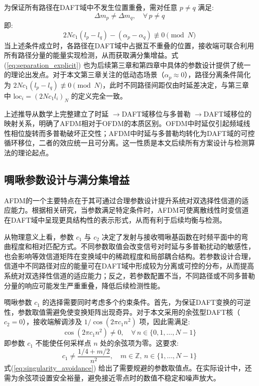 为保证所有路径在DAFT域中不发生位置重叠，需对任意 $p \neq q$ 满足:
\begin{equation}
    \Delta m_p \neq \Delta m_q, \quad \forall\, p \neq q
    \label{eq:path_separation_condition}
\end{equation}
即:
\begin{equation}
    2Nc_1(l_p - l_q) - (\alpha_p - \alpha_q) \not\equiv 0 \pmod{N}
    \label{eq:separation_explicit}
\end{equation}
当上述条件成立时，各路径在DAFT域中占据互不重叠的位置，接收端可联合利用所有路径分量的能量实现检测，从而获取满分集增益。式(\ref{eq:separation_explicit}) 也为后续第三章和第四章中具体的参数设计提供了统一的理论出发点。对于本文第三章关注的低动态场景（$\alpha_p \approx 0$），路径分离条件简化为 $2Nc_1(l_p - l_q) \not\equiv 0 \pmod{N}$，此时不同路径间距仅由时延差决定，与第三章中 $\mathrm{loc}_i = (2Nc_1 l_i)_N$ 的定义完全一致。

上述推导从数学上完整建立了时延 $\to$DAFT域移位与多普勒 $\to$DAFT域移位的映射关系，明确了AFDM相对于OFDM的本质区别。OFDM中时延仅引起频域线性相位旋转而多普勒破坏正交性；AFDM中时延与多普勒均转化为DAFT域的可控循环移位，二者的效应统一且可分离。这一性质是本文后续所有方案设计与检测算法的理论起点。

\subsection{啁啾参数设计与满分集增益}

AFDM的一个主要特点在于其可通过合理参数设计提升系统对双选择性信道的适应能力。根据相关研究，当参数满足特定条件时，AFDM可使离散线性时变信道在DAFT域中呈现更具结构性的表示形式，从而有利于后续均衡与检测\cite{bemaniAFDMFullDiversity2021, taoAffineFrequencyDivision2025}。

从物理意义上看，参数 $c_1$ 与 $c_2$ 决定了发射与接收啁啾基函数在时频平面中的弯曲程度和相对匹配方式。不同参数取值会改变信号对时延与多普勒扰动的敏感性，也会影响等效信道矩阵在变换域中的稀疏程度和局部耦合结构。若参数设计合理，信道中不同路径对应的能量可在DAFT域中形成较为分离或可控的分布，从而提高系统对双选择性信道的适应能力；反之，若参数配置不当，不同路径或不同多普勒分量的响应可能发生严重重叠，降低后续检测性能。


啁啾参数 $c_1$ 的选择需要同时考虑多个约束条件。首先，为保证DAFT变换的可逆性，参数取值需避免使变换矩阵出现奇异。对于本文采用的余弦型DAFT核（$c_2=0$），接收端解调涉及 $1/\cos(2\pi c_1 n^2)$ 项，因此需满足:
\begin{equation}
    \cos(2\pi c_1 n^2) \neq 0, \quad \forall\, n \in \{0,1,\ldots,N-1\}
    \label{eq:invertibility_constraint}
\end{equation}
即参数 $c_1$ 不能使任何采样点 $n$ 处的余弦项为零。这要求:
\begin{equation}
    c_1 \neq \frac{1/4 + m/2}{n^2}, \quad m \in \mathbb{Z}, \, n \in \{1,\ldots,N-1\}
    \label{eq:singularity_avoidance}
\end{equation}
式(\ref{eq:singularity_avoidance}) 给出了需要规避的参数取值点。在实际设计中，还需为余弦项设置安全裕量，避免接近零点时的数值不稳定和噪声放大。

